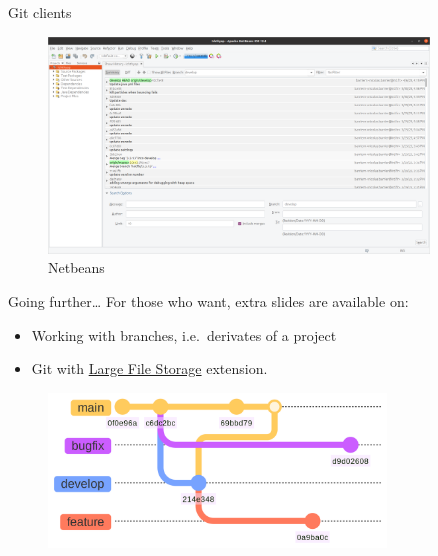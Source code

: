 \documentclass[10pt]{beamer}
\begin{document}
\begin{frame}{Git clients}
\protect\hypertarget{git-clients-3}{}
\begin{figure}

{\centering \includegraphics[width=0.9\textwidth]{img/netbeans.png}

}

\caption{\label{fig-netbeans}Netbeans}

\end{figure}
\end{frame}

\begin{frame}{Going further\ldots{}}
\protect\hypertarget{going-further}{}
For those who want, extra slides are available on:

\begin{itemize}
\item
  Working with branches, i.e.~derivates of a project
\item
  Git with \href{https://git-lfs.github.com/}{Large File Storage}
  extension.
\end{itemize}

\begin{figure}[H]

{\centering \includegraphics[width=0.8\textwidth]{mermaid/mermaid-figure-9.png}

}

\end{figure}
\end{frame}
\end{document}
